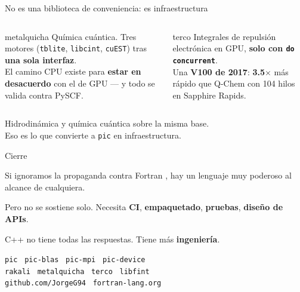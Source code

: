 \documentclass[aspectratio=169]{beamer}
\begin{document}
\begin{frame}{No es una biblioteca de conveniencia: es infraestructura}
  \begin{columns}[T,onlytextwidth]
      \begin{block}{metalquicha}
        {\footnotesize Química cuántica. Tres motores (\texttt{tblite}, \texttt{libcint},
        \texttt{cuEST}) tras \textbf{una sola interfaz}. \\[.3em]
        El camino CPU existe para \textbf{estar en desacuerdo} con el de GPU ---
        y todo se valida contra PySCF.}
      \end{block}
      \begin{block}{terco}
        {\footnotesize Integrales de repulsión electrónica en GPU, \textbf{solo con
        \texttt{do concurrent}}. \\[.3em]
        Una \textbf{V100 de 2017}: \textbf{3.5$\times$} más rápido que Q-Chem con
        104 hilos en Sapphire Rapids.}
      \end{block}
  \end{columns}
  \vfill
  \begin{exampleblock}{}
    \centering Hidrodinámica y química cuántica sobre la misma base. \\
    {\footnotesize Eso es lo que convierte a \texttt{pic} en infraestructura.}
  \end{exampleblock}
\end{frame}

\begin{frame}{Cierre}
  \begin{cookiequote}
    Si ignoramos la propaganda contra Fortran , hay un lenguaje muy poderoso al alcance de cualquiera.
  \end{cookiequote}
  \vspace{.6em}
  \centering
  Pero no se sostiene solo. Necesita \textbf{CI}, \textbf{empaquetado}, \textbf{pruebas}, \textbf{diseño de APIs}.

  \vspace{.8em}
  {\large C++ no tiene todas las respuestas. Tiene más \textbf{ingeniería}.}

  \vspace{1em}
  {\footnotesize
  \texttt{pic} \textperiodcentered\ \texttt{pic-blas} \textperiodcentered\ \texttt{pic-mpi} \textperiodcentered\ \texttt{pic-device} \\
  \texttt{rakali} \textperiodcentered\ \texttt{metalquicha} \textperiodcentered\ \texttt{terco} \textperiodcentered\ \texttt{libfint} \\[.4em]
  \texttt{github.com/JorgeG94} \textperiodcentered\ \texttt{fortran-lang.org}}
\end{frame}
\end{document}
